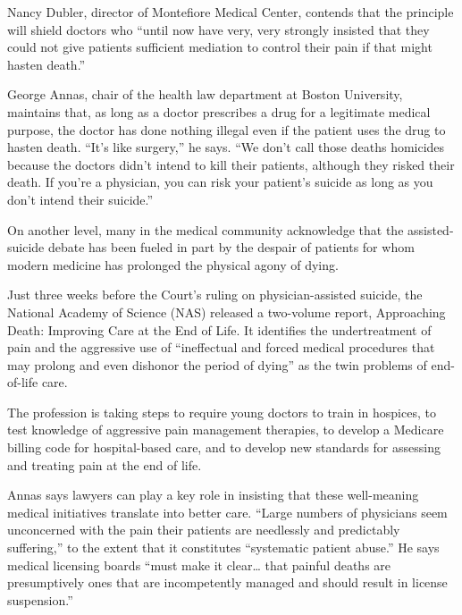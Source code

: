 Nancy Dubler, director of Montefiore Medical Center, contends that the principle will shield doctors who “until now have very, very strongly insisted that they could not give patients sufficient mediation to control their pain if that might hasten death.”

George Annas, chair of the health law department at Boston University, maintains that, as long as a doctor prescribes a drug for a legitimate medical purpose, the doctor has done nothing illegal even if the patient uses the drug to hasten death. “It’s like surgery,” he says. “We don’t call those deaths homicides because the doctors didn’t intend to kill their patients, although they risked their death. If you’re a physician, you can risk your patient’s suicide as long as you don’t intend their suicide.”

On another level, many in the medical community acknowledge that the assisted-suicide debate has been fueled in part by the despair of patients for whom modern medicine has prolonged the physical agony of dying.

Just three weeks before the Court’s ruling on physician-assisted suicide, the National Academy of Science (NAS) released a two-volume report, Approaching Death: Improving Care at the End of Life. It identifies the undertreatment of pain and the aggressive use of “ineffectual and forced medical procedures that may prolong and even dishonor the period of dying” as the twin problems of end-of-life care.

The profession is taking steps to require young doctors to train in hospices, to test knowledge of aggressive pain management therapies, to develop a Medicare billing code for hospital-based care, and to develop new standards for assessing and treating pain at the end of life.

Annas says lawyers can play a key role in insisting that these well-meaning medical initiatives translate into better care. “Large numbers of physicians seem unconcerned with the pain their patients are needlessly and predictably suffering,” to the extent that it constitutes “systematic patient abuse.” He says medical licensing boards “must make it clear… that painful deaths are presumptively ones that are incompetently managed and should result in license suspension.”

